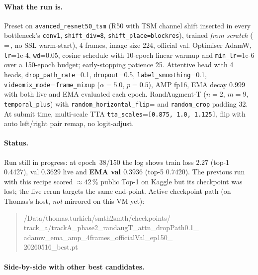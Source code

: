 \paragraph{What the run is.}  Preset
 on
\texttt{avanced\_resnet50\_tsm} (R50 with TSM channel shift inserted in
every bottleneck's \texttt{conv1}, \texttt{shift\_div=8},
\texttt{shift\_place=blockres}), trained \emph{from scratch}
(\,=\,, no SSL warm-start), 4
frames, image size 224, official val.  Optimiser AdamW, \texttt{lr}=1e-4,
\texttt{wd}=0.05, cosine schedule with 10-epoch linear warmup and
\texttt{min\_lr}=1e-6 over a 150-epoch budget; early-stopping patience
25.  Attentive head with 4 heads, \texttt{drop\_path\_rate}=0.1,
\texttt{dropout}=0.5, \texttt{label\_smoothing}=0.1,
\texttt{videomix\_mode}=\texttt{frame\_mixup} (\(\alpha=5.0\),
\(p=0.5\)), AMP fp16, EMA decay 0.999 with both live and EMA evaluated
each epoch.  RandAugment-T (\(n=2\), \(m=9\),
\texttt{temporal\_plus}) with \texttt{random\_horizontal\_flip}=
and \texttt{random\_crop} padding 32.  At submit time, multi-scale TTA
\texttt{tta\_scales}=\texttt{[0.875, 1.0, 1.125]}, flip with auto
left/right pair remap, no logit-adjust.

\paragraph{Status.}  Run still in progress: at epoch~38/150 the log
shows train loss \(2.27\) (top-1 0.4427), val \(0.3629\) live and
\textbf{EMA val \(0.3936\)} (top-5 0.7420).  The previous run with this
recipe scored \(\approx 42\,\%\) public Top-1 on Kaggle but its
checkpoint was lost; the live rerun targets the same end-point.
Active checkpoint path (on Thomas's host, \emph{not} mirrored on this
VM yet):

\begin{quote}\footnotesize\ttfamily\raggedright
/Data/thomas.turkieh/smth2smth/checkpoints/\\
track\_a/trackA\_phase2\_randaugT\_attn\_dropPath0.1\_\\
adamw\_ema\_amp\_4frames\_officialVal\_ep150\_\\
20260516\_best.pt
\end{quote}

\paragraph{Side-by-side with other best candidates.}

